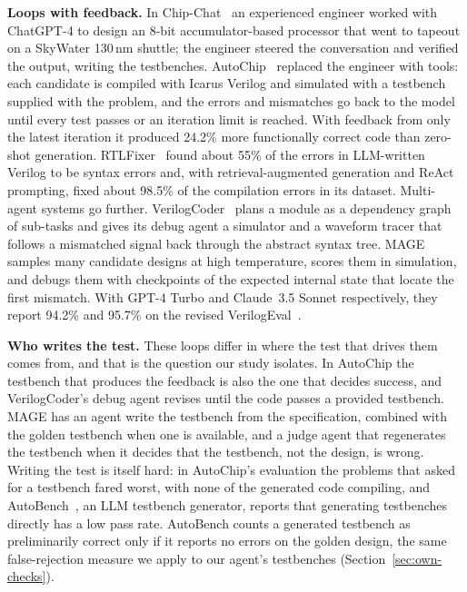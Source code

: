 \documentclass[11pt,a4paper]{article}
\begin{document}
\textbf{Loops with feedback.} In Chip-Chat~\cite{chipchat} an experienced engineer worked with ChatGPT-4 to design an
8-bit accumulator-based processor that went to tapeout on a SkyWater 130\,nm shuttle; the engineer steered the
conversation and verified the output, writing the testbenches. AutoChip~\cite{autochip} replaced the engineer with
tools: each candidate is compiled with Icarus Verilog and simulated with a testbench supplied with the problem, and
the errors and mismatches go back to the model until every test passes or an iteration limit is reached. With
feedback from only the latest iteration it produced 24.2\% more functionally correct code than zero-shot generation.
RTLFixer~\cite{rtlfixer} found about 55\% of the errors in LLM-written Verilog to be syntax errors and, with
retrieval-augmented generation and ReAct prompting, fixed about 98.5\% of the compilation errors in its dataset.
Multi-agent systems go further. VerilogCoder~\cite{verilogcoder} plans a module as a dependency graph of sub-tasks
and gives its debug agent a simulator and a waveform tracer that follows a mismatched signal back through the
abstract syntax tree. MAGE~\cite{mage} samples many candidate designs at high temperature, scores them in simulation,
and debugs them with checkpoints of the expected internal state that locate the first mismatch. With GPT-4 Turbo and
Claude~3.5 Sonnet respectively, they report 94.2\% and 95.7\% on the revised VerilogEval~\cite{revisiting}.

\textbf{Who writes the test.} These loops differ in where the test that drives them comes from, and that is the
question our study isolates. In AutoChip the testbench that produces the feedback is also the one that decides
success, and VerilogCoder's debug agent revises until the code passes a provided testbench. MAGE has an agent write
the testbench from the specification, combined with the golden testbench when one is available, and a judge agent
that regenerates the testbench when it decides that the testbench, not the design, is wrong. Writing the test is
itself hard: in AutoChip's evaluation the problems that asked for a testbench fared worst, with none of the generated
code compiling, and AutoBench~\cite{autobench}, an LLM testbench generator, reports that generating testbenches
directly has a low pass rate. AutoBench counts a generated testbench as preliminarily correct only if it reports no
errors on the golden design, the same false-rejection measure we apply to our agent's testbenches
(Section~\ref{sec:own-checks}).
\end{document}
